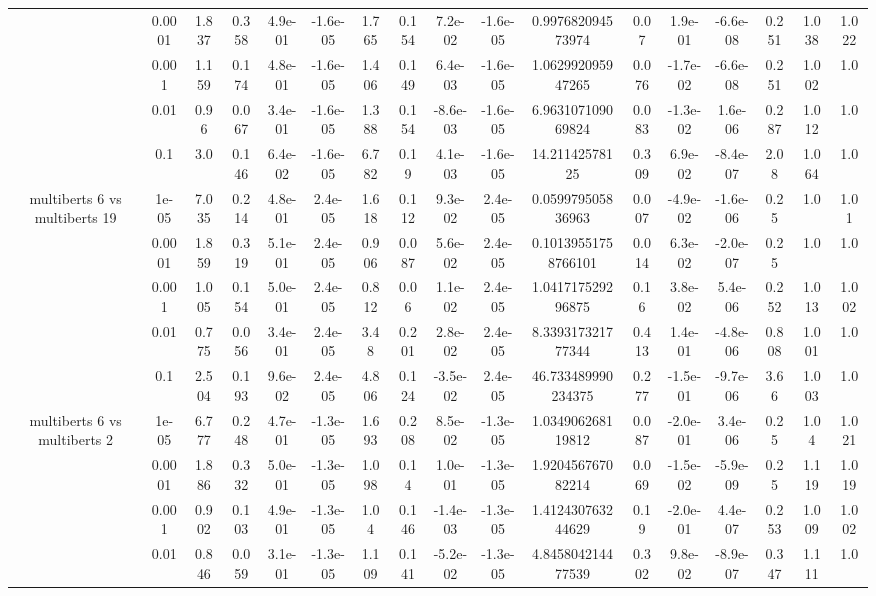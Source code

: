 \begin{tabular}{|c|c|c|c|c|c|c|c|c|c|c|c|c|c|c|c|c|}
 & 0.0001 & 1.837 & 0.358 & 4.9e-01 & -1.6e-05 & 1.765 & 0.154 & 7.2e-02 & -1.6e-05 & 0.997682094573974 & 0.07 & 1.9e-01 & -6.6e-08 & 0.251 & 1.038 & 1.022 \\
 & 0.001 & 1.159 & 0.174 & 4.8e-01 & -1.6e-05 & 1.406 & 0.149 & 6.4e-03 & -1.6e-05 & 1.062992095947265 & 0.076 & -1.7e-02 & -6.6e-08 & 0.251 & 1.002 & 1.0 \\
 & 0.01 & 0.96 & 0.067 & 3.4e-01 & -1.6e-05 & 1.388 & 0.154 & -8.6e-03 & -1.6e-05 & 6.963107109069824 & 0.083 & -1.3e-02 & 1.6e-06 & 0.287 & 1.012 & 1.0 \\
 & 0.1 & 3.0 & 0.146 & 6.4e-02 & -1.6e-05 & 6.782 & 0.19 & 4.1e-03 & -1.6e-05 & 14.21142578125 & 0.309 & 6.9e-02 & -8.4e-07 & 2.08 & 1.064 & 1.0 \\
\hline
\multirow{5}{*}{multiberts 6 vs multiberts 19} & 1e-05 & 7.035 & 0.214 & 4.8e-01 & 2.4e-05 & 1.618 & 0.112 & 9.3e-02 & 2.4e-05 & 0.059979505836963 & 0.007 & -4.9e-02 & -1.6e-06 & 0.25 & 1.0 & 1.01 \\
 & 0.0001 & 1.859 & 0.319 & 5.1e-01 & 2.4e-05 & 0.906 & 0.087 & 5.6e-02 & 2.4e-05 & 0.10139551758766101 & 0.014 & 6.3e-02 & -2.0e-07 & 0.25 & 1.0 & 1.0 \\
 & 0.001 & 1.005 & 0.154 & 5.0e-01 & 2.4e-05 & 0.812 & 0.06 & 1.1e-02 & 2.4e-05 & 1.041717529296875 & 0.16 & 3.8e-02 & 5.4e-06 & 0.252 & 1.013 & 1.002 \\
 & 0.01 & 0.775 & 0.056 & 3.4e-01 & 2.4e-05 & 3.48 & 0.201 & 2.8e-02 & 2.4e-05 & 8.339317321777344 & 0.413 & 1.4e-01 & -4.8e-06 & 0.808 & 1.001 & 1.0 \\
 & 0.1 & 2.504 & 0.193 & 9.6e-02 & 2.4e-05 & 4.806 & 0.124 & -3.5e-02 & 2.4e-05 & 46.733489990234375 & 0.277 & -1.5e-01 & -9.7e-06 & 3.66 & 1.003 & 1.0 \\
\hline
\multirow{5}{*}{multiberts 6 vs multiberts 2} & 1e-05 & 6.777 & 0.248 & 4.7e-01 & -1.3e-05 & 1.693 & 0.208 & 8.5e-02 & -1.3e-05 & 1.034906268119812 & 0.087 & -2.0e-01 & 3.4e-06 & 0.25 & 1.04 & 1.021 \\
 & 0.0001 & 1.886 & 0.332 & 5.0e-01 & -1.3e-05 & 1.098 & 0.14 & 1.0e-01 & -1.3e-05 & 1.920456767082214 & 0.069 & -1.5e-02 & -5.9e-09 & 0.25 & 1.119 & 1.019 \\
 & 0.001 & 0.902 & 0.103 & 4.9e-01 & -1.3e-05 & 1.04 & 0.146 & -1.4e-03 & -1.3e-05 & 1.412430763244629 & 0.19 & -2.0e-01 & 4.4e-07 & 0.253 & 1.009 & 1.002 \\
 & 0.01 & 0.846 & 0.059 & 3.1e-01 & -1.3e-05 & 1.109 & 0.141 & -5.2e-02 & -1.3e-05 & 4.845804214477539 & 0.302 & 9.8e-02 & -8.9e-07 & 0.347 & 1.111 & 1.0 \\

\end{tabular}

